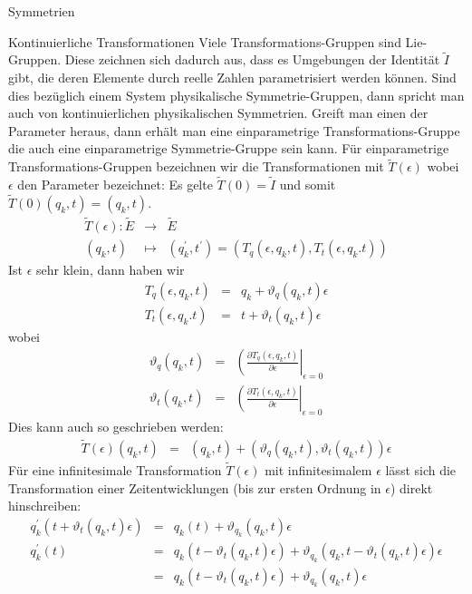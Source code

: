 \documentclass[a4paper,fleqn]{article}
\numberwithin{equation}{section}
\begin{document}
\begin{section}{Symmetrien}
\begin{subsection}{Kontinuierliche Transformationen}
Viele Transformations-Gruppen sind Lie-Gruppen. Diese zeichnen sich dadurch aus, dass es Umgebungen der Identität $\tilde{I}$ gibt, die deren Elemente durch reelle Zahlen parametrisiert werden können. Sind dies bezüglich einem System physikalische Symmetrie-Gruppen, dann spricht man auch von kontinuierlichen physikalischen Symmetrien. Greift man einen der Parameter heraus, dann erhält man eine einparametrige
Transformations-Gruppe die auch eine einparametrige
Symmetrie-Gruppe sein kann. Für einparametrige Transformations-Gruppen bezeichnen wir die Transformationen mit $\tilde{T}(\epsilon)$ wobei $\epsilon$ den Parameter bezeichnet: Es gelte $\tilde{T}(0)=\tilde{I}$ und somit $\tilde{T}(0)(q_k,t)=(q_k,t)$.
\begin{eqnarray*}
\tilde{T}(\epsilon): \tilde{E} &\rightarrow&\tilde{E}\\
(q_k,t) &\mapsto& ( q_k^\prime,t^\prime)=\left(T_q(\epsilon,q_k,t), T_t(\epsilon,q_k.t)\right)
\end{eqnarray*}
Ist $\epsilon$ sehr klein, dann haben wir
\begin{eqnarray*}
T_q(\epsilon,q_k,t) &=& q_k+\vartheta_q(q_k,t)\epsilon\\
T_t(\epsilon,q_k.t) &=& t+\vartheta_t(q_k,t)\epsilon
\end{eqnarray*}
wobei
\begin{eqnarray*}
\vartheta_q(q_k,t) &=& \left(\frac{\partial T_q(\epsilon,q_k,t)}{\partial \epsilon}\right|_{\epsilon=0}\\
\vartheta_t(q_k,t) &=& \left(\frac{\partial T_t(\epsilon,q_k,t)}{\partial \epsilon}\right|_{\epsilon=0}
\end{eqnarray*}
Dies kann auch so geschrieben werden:
\begin{eqnarray*}
\tilde{T}(\epsilon)(q_k,t) &=& (q_k,t)+(\vartheta_q(q_k,t),\vartheta_t(q_k,t))\epsilon
\end{eqnarray*}
Für eine infinitesimale Transformation $\tilde{T}(\epsilon)$ mit infinitesimalem $\epsilon$ lässt sich die Transformation
einer Zeitentwicklungen (bis zur ersten Ordnung in $\epsilon$) direkt hinschreiben:
\begin{eqnarray*}
q_k^\prime(t+\vartheta_t(q_k,t)\epsilon) &=& q_k(t)+\vartheta_{q_k}(q_k,t)\epsilon\\
q_k^\prime(t) &=& q_k(t-\vartheta_t(q_k,t)\epsilon)+\vartheta_{q_k}(q_k,t-\vartheta_t(q_k,t)\epsilon)\epsilon\\
&=& q_k(t-\vartheta_t(q_k,t)\epsilon)+\vartheta_{q_k}(q_k,t)\epsilon\\

\end{eqnarray*}
\end{subsection}
\end{section}
\end{document}
